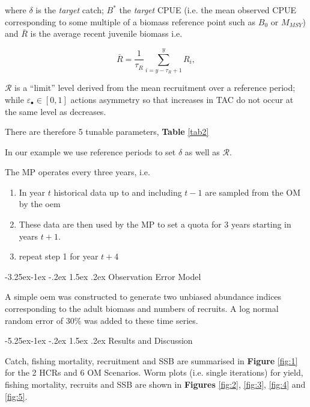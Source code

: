 \documentclass[a4paper, 10pt]{article}
\makeatletter
\newcommand{\ds}{\displaystyle}
\newcommand{\veps}{\varepsilon}
\renewcommand{\subsection}{\@startsection{subsection}{2}{\z@}%
 {-3.25ex\@plus -1ex \@minus -.2ex}%
 {1.5ex \@plus .2ex}%
 {\normalfont\bfseries\slshape}}
\renewcommand{\section}{\@startsection{section}{1}{\z@}%
 {-5.25ex\@plus -1ex \@minus -.2ex}%
 {1.5ex \@plus .2ex}%
 {\normalfont\bfseries}}
\makeatother
\begin{document}
 where $\delta$ is the \textit{target} catch; $B^*$ the \textit{target} CPUE (i.e. the mean observed CPUE corresponding to some 
 multiple of a biomass reference point such as $B_0$ or $M_{MSY}$) and 
$\bar{R}$ is the average recent juvenile biomass i.e.

\begin{equation}
 \ds \bar{R}=\frac{1}{\tau_R}\sum\limits_{i=y-\tau_R+1}^{y}R_i,
 \end{equation}

 
$\mathcal{R}$ is a ``limit'' level derived from the mean recruitment over a reference period; \\
while $\veps_\bullet\in[0,1]$ actions asymmetry so that increases in TAC do not occur at the same level as decreases.

There are therefore 5 tunable parameters, \textbf{Table} \ref{tab2}

In our example we use reference periods to set $\delta$ as well as $\mathcal{R}$. 

The MP operates every three years, i.e. 

\begin{enumerate}
 \item In year $t$ historical data up to and including $t-1$ are sampled from the \gls{OM} by the \gls{oem}
 \item These data are then used by the \gls{MP} to set a quota for 3 years starting in years $t+1$. 
 \item repeat step 1 for year $t+4$
\end{enumerate}


\subsection{Observation Error Model}

A simple \gls{oem} was constructed to generate two unbiased abundance indices corresponding to the adult biomass and numbers of recruits.
A log normal random error of 30\% was added to these time series.

\section{Results and Discussion}

Catch, fishing mortality, recruitment and SSB are summarised in \textbf{Figure} \ref{fig:1} for the 2 HCRs and 6 OM Scenarios.
Worm plots (i.e. single iterations) for yield, fishing mortality, recruits and SSB are shown in \textbf{Figures} \ref{fig:2}, \ref{fig:3}, \ref{fig:4} and \ref{fig:5}. 
\end{document}
